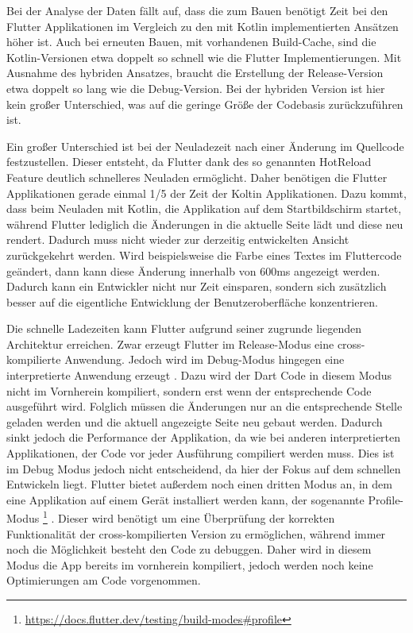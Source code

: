 Bei der Analyse der Daten fällt auf, dass die zum Bauen benötigt Zeit bei den Flutter Applikationen im Vergleich zu den mit Kotlin implementierten Ansätzen höher ist. 
Auch bei erneuten Bauen, mit vorhandenen Build-Cache, sind die Kotlin-Versionen etwa doppelt so schnell wie die Flutter Implementierungen.
Mit Ausnahme des hybriden Ansatzes, braucht die Erstellung der Release-Version etwa doppelt so lang wie die Debug-Version. 
Bei der hybriden Version ist hier kein großer Unterschied, was auf die geringe Größe der Codebasis zurückzuführen ist.

Ein großer Unterschied ist bei der Neuladezeit nach einer Änderung im Quellcode festzustellen. Dieser entsteht, da Flutter dank des so genannten HotReload Feature deutlich schnelleres Neuladen ermöglicht. Daher benötigen die Flutter Applikationen gerade einmal 1/5 der Zeit der Koltin Applikationen. Dazu kommt, dass beim Neuladen mit Kotlin, die Applikation auf dem Startbildschirm startet, während Flutter lediglich  die Änderungen in die aktuelle Seite lädt und diese neu rendert. Dadurch muss nicht wieder zur derzeitig entwickelten Ansicht zurückgekehrt werden. Wird beispielsweise die Farbe eines Textes im Fluttercode geändert, dann kann diese Änderung innerhalb von 600ms angezeigt werden. Dadurch kann ein Entwickler nicht nur Zeit einsparen, sondern sich zusätzlich besser auf die eigentliche Entwicklung der Benutzeroberfläche konzentrieren.

Die schnelle Ladezeiten kann Flutter aufgrund seiner zugrunde liegenden Architektur erreichen. Zwar erzeugt Flutter im Release-Modus eine cross-kompilierte Anwendung. Jedoch wird im Debug-Modus hingegen eine interpretierte Anwendung erzeugt \cite{flutter_debug_dart}. Dazu wird der Dart Code in diesem Modus nicht im Vornherein kompiliert, sondern erst wenn der entsprechende Code ausgeführt wird. Folglich müssen die Änderungen nur an die entsprechende Stelle geladen werden und die aktuell angezeigte Seite neu gebaut werden. Dadurch sinkt jedoch die Performance der Applikation, da wie bei anderen interpretierten Applikationen, der Code vor jeder Ausführung compiliert werden muss. Dies ist im Debug Modus jedoch nicht entscheidend, da hier der Fokus auf dem schnellen Entwickeln liegt. Flutter bietet außerdem noch einen dritten Modus an, in dem eine Applikation auf einem Gerät installiert werden kann, der sogenannte Profile-Modus \footnote{\url{https://docs.flutter.dev/testing/build-modes\#profile}} \cite{flutter_debug_dart}. 
Dieser wird benötigt um eine Überprüfung der korrekten Funktionalität der cross-kompilierten Version zu ermöglichen, während immer noch die Möglichkeit besteht den Code zu debuggen. Daher wird in diesem Modus die App bereits im vornherein kompiliert, jedoch werden noch keine Optimierungen am Code vorgenommen.

